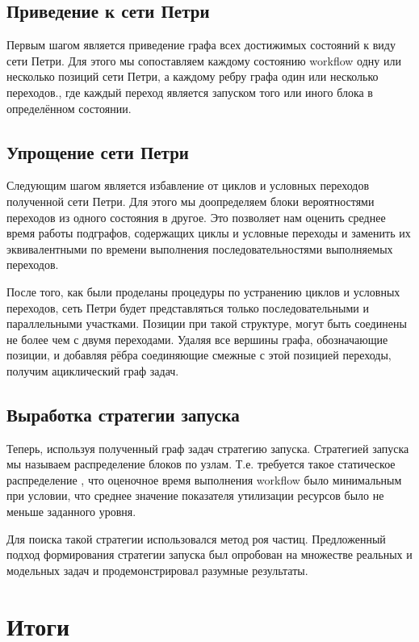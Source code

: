 \documentclass[a4paper,14pt]{article}
\begin{document}
\subsection{Приведение к сети Петри}
Первым шагом является приведение графа всех достижимых состояний к виду сети Петри. Для этого мы сопоставляем каждому состоянию workflow одну или несколько позиций сети Петри, а каждому ребру графа один или несколько переходов., где каждый переход является запуском того или иного блока в определённом состоянии.


\subsection{Упрощение сети Петри}
Следующим шагом является избавление от циклов и условных переходов полученной сети Петри. Для этого мы доопределяем блоки вероятностями переходов из одного состояния в другое.
Это позволяет нам оценить среднее время работы подграфов, содержащих циклы и условные переходы и заменить их  эквивалентными по времени выполнения последовательностями выполняемых переходов.

После того, как были проделаны процедуры по устранению циклов и условных переходов, сеть Петри будет представляться только последовательными и параллельными участками. Позиции при такой структуре, могут быть соединены не более чем с двумя переходами. Удаляя все вершины графа, обозначающие позиции, и добавляя рёбра соединяющие смежные с этой позицией переходы, получим ациклический граф задач. 

\subsection{Выработка стратегии запуска}
Теперь, используя полученный граф задач стратегию запуска. Стратегией запуска мы называем распределение блоков по узлам. Т.е. требуется такое статическое распределение , что оценочное время выполнения workflow было минимальным при условии, что среднее значение показателя утилизации ресурсов было не меньше заданного уровня.

Для поиска такой стратегии использовался метод роя частиц.
Предложенный подход формирования стратегии запуска был опробован на множестве реальных и модельных задач и продемонстрировал разумные результаты.


\section{Итоги}
\end{document}
